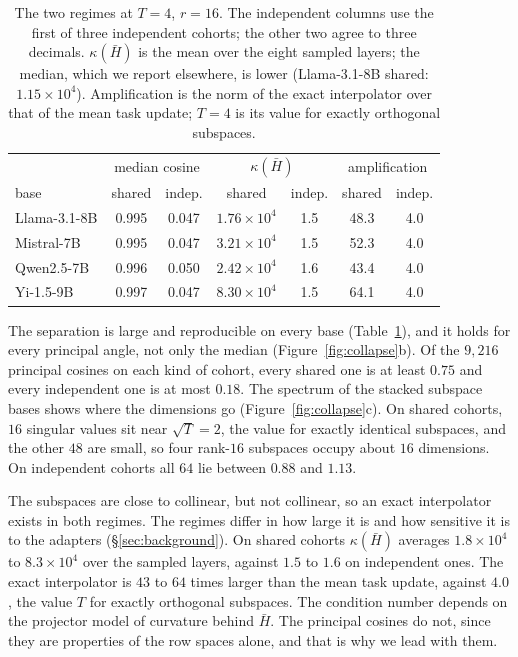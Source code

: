 \begin{table}[pos=tbp]
\centering
\small
\caption{The two regimes at $T = 4$, $r = 16$. The independent columns use
the first of three independent cohorts; the other two agree to three
decimals.
$\kappa(\bar H)$ is the mean over the eight sampled layers; the median, which
we report elsewhere, is lower (Llama-3.1-8B shared: $1.15\times10^{4}$).
Amplification is the norm of the exact interpolator over that of the mean task
update; $T = 4$ is its value for exactly orthogonal subspaces.}
\label{tab:regimes}
\begin{tabular}{lcccccc}
\toprule
 & \multicolumn{2}{c}{median cosine} & \multicolumn{2}{c}{$\kappa(\bar H)$}
 & \multicolumn{2}{c}{amplification} \\
base & shared & indep. & shared & indep. & shared & indep. \\
\midrule
Llama-3.1-8B & 0.995 & 0.047 & $1.76\times10^{4}$ & 1.5 & 48.3 & 4.0 \\
Mistral-7B   & 0.995 & 0.047 & $3.21\times10^{4}$ & 1.5 & 52.3 & 4.0 \\
Qwen2.5-7B   & 0.996 & 0.050 & $2.42\times10^{4}$ & 1.6 & 43.4 & 4.0 \\
Yi-1.5-9B    & 0.997 & 0.047 & $8.30\times10^{4}$ & 1.5 & 64.1 & 4.0 \\
\bottomrule
\end{tabular}
\end{table}

The separation is large and reproducible on every base
(Table~\ref{tab:regimes}), and it holds for every principal angle, not only
the median (Figure~\ref{fig:collapse}b). Of the $9{,}216$ principal cosines on
each kind of cohort, every shared one is at least $0.75$ and every independent one is at
most $0.18$. The spectrum of the stacked subspace bases shows where the
dimensions go (Figure~\ref{fig:collapse}c). On shared cohorts, $16$ singular
values sit near $\sqrt{T} = 2$, the value for exactly identical subspaces, and
the other $48$ are small, so four rank-$16$ subspaces occupy about $16$
dimensions. On independent cohorts all $64$ lie between $0.88$ and $1.13$.

The subspaces are close to collinear, but not collinear, so an exact
interpolator exists in both regimes. The regimes differ in how large it is and
how sensitive it is to the adapters (\S\ref{sec:background}). On shared
cohorts $\kappa(\bar H)$ averages $1.8\times10^{4}$ to $8.3\times10^{4}$ over
the sampled layers, against $1.5$ to $1.6$ on independent ones. The exact
interpolator is $43$ to $64$ times larger than the mean task update, against $4.0$, the value $T$ for
exactly orthogonal subspaces. The condition number depends on the projector
model of curvature behind $\bar H$. The principal cosines do not, since they
are properties of the row spaces alone, and that is why we lead with them.

